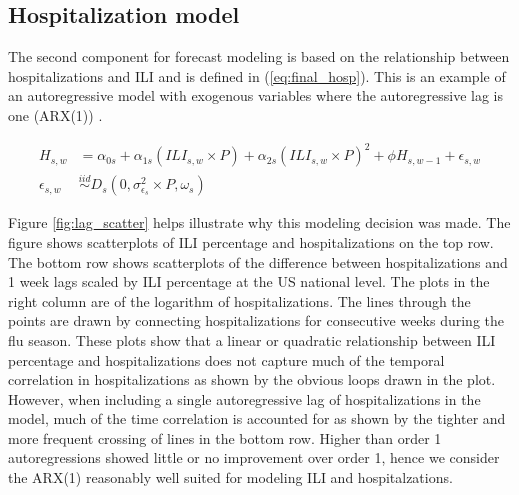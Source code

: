 \subsection{Hospitalization model} \label{sec:hospital_model}

The second component for forecast modeling is based on the relationship between 
hospitalizations and ILI and is defined in (\ref{eq:final_hosp}).
This is an example of an autoregressive model with exogenous variables where 
the autoregressive lag is one (ARX(1)) 
\cite[]{raftery2010online,ljung1987system}. 

\begin{equation}
    \begin{aligned}
    \label{eq:final_hosp}
    H_{s,w} &= \alpha_{0s} + \alpha_{1s} (ILI_{s,w} \times P) + \alpha_{2s} 
    (ILI_{s,w} \times P)^2 + \phi H_{s,w-1} + \epsilon_{s,w}\\ 
    \epsilon_{s,w} &\overset{iid}{\sim} D_s(0, \sigma_{\epsilon_s}^2 \times P, 
    \omega_s) %
    \end{aligned}
\end{equation}

Figure \ref{fig:lag_scatter} helps
illustrate why this modeling decision was made.
The figure shows scatterplots of ILI percentage and 
hospitalizations on the top row.
The bottom row shows scatterplots of the difference between hospitalizations and 
1 week lags scaled 
by ILI percentage at the US national level. The plots in the right column
are of the logarithm of hospitalizations. The lines through the points are
drawn by connecting hospitalizations for consecutive weeks during the flu 
season.
These plots show that a linear or quadratic relationship between ILI percentage 
and hospitalizations does not capture much of the temporal correlation in 
hospitalizations as shown by the obvious loops drawn in the plot. 
However, when including a 
single autoregressive lag of hospitalizations in the model, much of the time 
correlation is
accounted for as shown by the tighter and more frequent crossing of lines
in the bottom row. Higher than order 1 autoregressions showed little or no 
improvement over order 1, hence we consider the ARX(1) reasonably well 
suited for modeling ILI and hospitalzations. 

